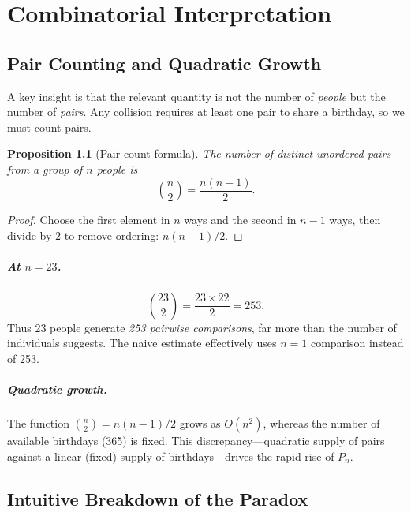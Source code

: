 \documentclass[12pt]{report}
\newtheorem{proposition}[theorem]{Proposition}
\theoremstyle{definition}
\begin{document}
\chapter{Combinatorial Interpretation}

\section{Pair Counting and Quadratic Growth}

A key insight is that the relevant quantity is not the number of \emph{people} but the
number of \emph{pairs}.  Any collision requires at least one pair to share a birthday,
so we must count pairs.

\begin{proposition}[Pair count formula]
\label{prop:pairs}
  The number of distinct unordered pairs from a group of $n$ people is
  \begin{equation}\label{eq:pairs}
    \binom{n}{2} = \frac{n(n-1)}{2}.
  \end{equation}
\end{proposition}

\begin{proof}
  Choose the first element in $n$ ways and the second in $n-1$ ways, then divide by $2$
  to remove ordering: $n(n-1)/2$.
\end{proof}

\paragraph{At $n = 23$.}
\[
  \binom{23}{2} = \frac{23 \times 22}{2} = 253.
\]
Thus 23 people generate \emph{253 pairwise comparisons}, far more than the number of
individuals suggests.  The naive estimate effectively uses $n=1$ comparison instead of
253.

\paragraph{Quadratic growth.}
The function $\binom{n}{2} = n(n-1)/2$ grows as $O(n^2)$, whereas the number of
available birthdays (365) is fixed.  This discrepancy—quadratic supply of pairs against
a linear (fixed) supply of birthdays—drives the rapid rise of $P_n$.

\section{Intuitive Breakdown of the Paradox}
\end{document}
